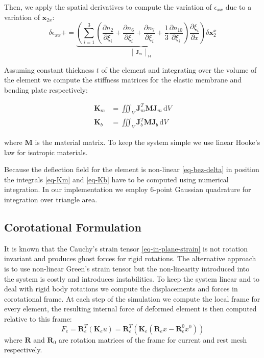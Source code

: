 \documentclass{egpubl}
\newcommand{\deriv}[2]{\frac{\partial #1}{\partial #2}}
\newcommand{\mat}[1]{\mathbf{#1}}
\begin{document}
Then, we apply the spatial derivatives to compute the variation of $\epsilon_{xx}$ due to a variation of $\mathbf{x}_{2x}$:
\begin{equation}
    \delta \epsilon_{xx} += 
    \underbrace{\left(
    \sum_{i=1}^{3} (\deriv{n_2}{\xi_i} + \deriv{n_6}{\xi_i} + \deriv{n_7}{\xi_i} + \frac{1}{3}\deriv{n_{10}}{\xi_i})
    \deriv{\xi_i}{x} \right) }_{\begin{bmatrix} \mat{J}_m \end{bmatrix}_{14}}  
 \delta \mathbf{x}_2^x 
\end{equation}

Assuming constant thickness $t$ of the element and integrating over the volume
of the element we compute the stiffness matrices for the elastic membrane
and bending plate respectively:

\begin{align}
    \label{eq-Km}
    \mat{K}_m & = \iiint_V \mat{J}_m^T \mat{M} \mat{J}_m \, \mathrm{d} V \\
    \label{eq-Kb}
    \mat{K}_b & = \iiint_V \mat{J}_b^T \mat{M} \mat{J}_b \, \mathrm{d} V
\end{align}

\noindent
where $\mat{M}$ is the material matrix. To keep the system simple we use linear
Hooke's law for isotropic materials.

Because the deflection field for the element is non-linear \eqref{eq-bez-delta}
in position the integrals \eqref{eq-Km} and \eqref{eq-Kb} have to be computed using
numerical integration. In our implementation we employ 6-point Gaussian
quadrature for integration over triangle area.


\subsection{Corotational Formulation} %
\label{sec-corot}

It is known that the Cauchy's strain tensor \eqref{eq-in-plane-strain} is not
rotation invariant \cite{Hauth2004,Muller2004} and produces ghost forces for rigid
rotations. The alternative approach is to use non-linear Green's strain tensor but the non-linearity introduced into the system is costly and introduces instabilities.
To keep the system linear and to deal
with rigid body rotations we compute the displacements and forces in
corotational frame. At each step of the simulation we compute the local
frame for every element, the resulting internal force of deformed element
is then computed relative to this frame:
%
\begin{equation}
    F_e = \mat{R}_e^T (\mat{K}_e u) = \mat{R}_e^T \left(\mat{K}_e(\mat{R}_e x - \mat{R}_e^0 x^0)\right)
\end{equation}
%
where $\mat{R}$ and $\mat{R}_0$ are rotation matrices of the frame for current and rest
mesh respectively.
\end{document}
